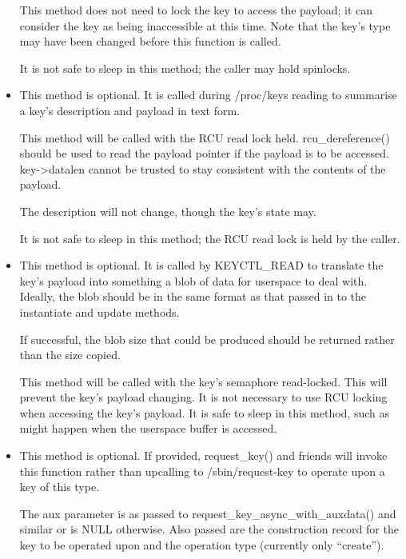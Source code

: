 \documentclass[a4paper,8pt,english]{sphinxmanual}
\begin{document}
\begin{itemize}
This method does not need to lock the key to access the payload; it can
consider the key as being inaccessible at this time. Note that the key's
type may have been changed before this function is called.

It is not safe to sleep in this method; the caller may hold spinlocks.

\item {} 

This method is optional. It is called during /proc/keys reading to
summarise a key's description and payload in text form.

This method will be called with the RCU read lock held. rcu\_dereference()
should be used to read the payload pointer if the payload is to be
accessed. key-\textgreater{}datalen cannot be trusted to stay consistent with the
contents of the payload.

The description will not change, though the key's state may.

It is not safe to sleep in this method; the RCU read lock is held by the
caller.

\item {} 

This method is optional. It is called by KEYCTL\_READ to translate the
key's payload into something a blob of data for userspace to deal with.
Ideally, the blob should be in the same format as that passed in to the
instantiate and update methods.

If successful, the blob size that could be produced should be returned
rather than the size copied.

This method will be called with the key's semaphore read-locked. This will
prevent the key's payload changing. It is not necessary to use RCU locking
when accessing the key's payload. It is safe to sleep in this method, such
as might happen when the userspace buffer is accessed.

\item {} 

This method is optional.  If provided, request\_key() and friends will
invoke this function rather than upcalling to /sbin/request-key to operate
upon a key of this type.

The aux parameter is as passed to request\_key\_async\_with\_auxdata() and
similar or is NULL otherwise.  Also passed are the construction record for
the key to be operated upon and the operation type (currently only
``create'').


\end{itemize}
\end{document}
